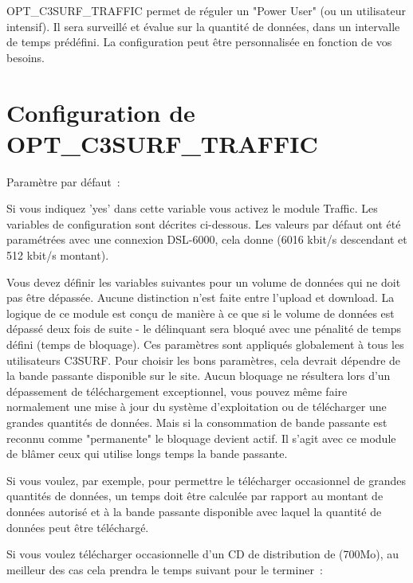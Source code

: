    OPT\_C3SURF\_TRAFFIC permet de réguler un "Power User" (ou un utilisateur intensif).
   Il sera surveillé et évalue sur la quantité de données, dans un intervalle de temps
   prédéfini. La configuration peut être personnalisée en fonction de vos besoins.

\section {Configuration de OPT\_C3SURF\_TRAFFIC}

\begin{description}


   Paramètre par défaut~: 

   Si vous indiquez 'yes' dans cette variable vous activez le module Traffic.
   Les variables de configuration sont décrites ci-dessous. Les valeurs par défaut
   ont été paramétrées avec une connexion DSL-6000, cela donne (6016 kbit/s descendant
   et 512 kbit/s montant).

   Vous devez définir les variables suivantes pour un volume de données qui ne doit pas
   être dépassée. Aucune distinction n'est faite entre l'upload et download. La logique
   de ce module est conçu de manière à ce que si le volume de données est dépassé deux
   fois de suite - le délinquant sera bloqué avec une pénalité de temps défini (temps de bloquage).
   Ces paramètres sont appliqués globalement à tous les utilisateurs C3SURF. Pour choisir
   les bons paramètres, cela devrait dépendre de la bande passante disponible sur le site.
   Aucun bloquage ne résultera lors d'un dépassement de téléchargement exceptionnel, vous pouvez
   même faire normalement une mise à jour du système d'exploitation ou de télécharger une grandes
   quantités de données. Mais si la consommation de bande passante est reconnu comme "permanente"
   le bloquage devient actif. Il s'agit avec ce module de blâmer ceux qui utilise longs temps
   la bande passante.

   Si vous voulez, par exemple, pour permettre le télécharger occasionnel de grandes quantités de données,
   un temps doit être calculée par rapport au montant de données autorisé et à la bande passante disponible
   avec laquel la quantité de données peut être téléchargé.


   Si vous voulez télécharger occasionnelle d'un CD de distribution de (700Mo), au meilleur des cas cela
   prendra le temps suivant pour le terminer~:


\end{description}
